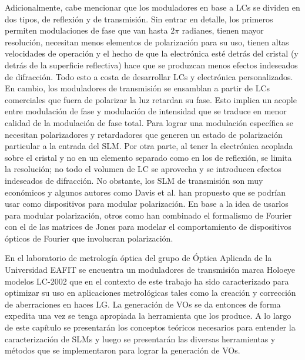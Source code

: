 Adicionalmente, cabe mencionar que los moduladores en base a LCs se
dividen en dos tipos, de reflexión y de transmisión. Sin entrar en
detalle, los primeros permiten modulaciones de fase que van hasta $2\pi$
radianes, tienen mayor resolución, necesitan menos elementos de
polarización para su uso, tienen altas velocidades de operación y el
hecho de que la electrónica esté detrás del cristal (y detrás de la
superficie reflectiva) hace que se produzcan menos efectos indeseados
de difracción. Todo esto a costa de desarrollar LCs y
electrónica personalizados. En cambio, los moduladores de transmisión
se ensamblan a partir de LCs comerciales que fuera de polarizar la luz
retardan su fase. Esto implica un acople entre modulación de fase y 
modulación de intensidad que se traduce en menor calidad de la
modulación de fase total. Para lograr una modulación específica se
necesitan polarizadores y retardadores que generen un 
estado de polarización particular a la entrada del SLM. Por otra
parte, al tener la electrónica acoplada sobre el cristal y no en un
elemento separado como en los de reflexión, se limita la
resolución; no todo el volumen de LC se aprovecha y se introducen
efectos indeseados de difracción. 
No obstante, los SLM de transmisión son muy económicos y algunos
autores como Davis et al.  han propuesto
que se podrían usar como dispositivos para modular polarización. En
base a la idea de usarlos para modular polarización, otros como  han
combinado el formalismo de Fourier con el de las matrices de Jones
para modelar el comportamiento de dispositivos ópticos de Fourier que
involucran polarización. 

En el laboratorio de metrología óptica del grupo de Óptica Aplicada de
la Universidad EAFIT se encuentra un moduladores de transmisión
marca Holoeye modelos LC-2002 que en el contexto de este
trabajo ha sido caracterizado para optimizar su uso en aplicaciones metrológicas
tales como la creación y corrección de aberraciones en haces LG.  
La generación de VOs se da entonces de forma expedita una vez se tenga apropiada la
herramienta que los produce.  
A lo largo de este capítulo se presentarán los conceptos teóricos
necesarios para entender la caracterización de SLMs y luego se
presentarán las diversas herramientas y métodos que se implementaron
para lograr la generación de VOs.


